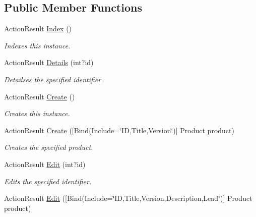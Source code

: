 \subsection*{Public Member Functions}
\begin{DoxyCompactItemize}
\item 
Action\+Result \hyperlink{class_open_1_1_g_i_1_1hypermart_1_1_controllers_1_1_products_controller_a244e974803aa1c0f91e8a4fcf0618a9d}{Index} ()
\begin{DoxyCompactList}\small\item\em Indexes this instance. \end{DoxyCompactList}\item 
Action\+Result \hyperlink{class_open_1_1_g_i_1_1hypermart_1_1_controllers_1_1_products_controller_aa5e18ee35c24f02d8932e7fb69a9fa0c}{Details} (int?id)
\begin{DoxyCompactList}\small\item\em Detailses the specified identifier. \end{DoxyCompactList}\item 
Action\+Result \hyperlink{class_open_1_1_g_i_1_1hypermart_1_1_controllers_1_1_products_controller_a1ead91e895aa356b20ba2840eafe0a99}{Create} ()
\begin{DoxyCompactList}\small\item\em Creates this instance. \end{DoxyCompactList}\item 
Action\+Result \hyperlink{class_open_1_1_g_i_1_1hypermart_1_1_controllers_1_1_products_controller_a86b2d44b3d7536bec77fc5bacf3d359a}{Create} (\mbox{[}Bind(Include=\char`\"{}I\+D,Title,Version\char`\"{})\mbox{]} Product product)
\begin{DoxyCompactList}\small\item\em Creates the specified product. \end{DoxyCompactList}\item 
Action\+Result \hyperlink{class_open_1_1_g_i_1_1hypermart_1_1_controllers_1_1_products_controller_a0bda16e05e1e8a17e1f728359e5076e9}{Edit} (int?id)
\begin{DoxyCompactList}\small\item\em Edits the specified identifier. \end{DoxyCompactList}\item 
Action\+Result \hyperlink{class_open_1_1_g_i_1_1hypermart_1_1_controllers_1_1_products_controller_a7b98181f09525a81fbce5ccb04000546}{Edit} (\mbox{[}Bind(Include=\char`\"{}I\+D,Title,Version,Description,Lead\char`\"{})\mbox{]} Product product)

\end{DoxyCompactItemize}
